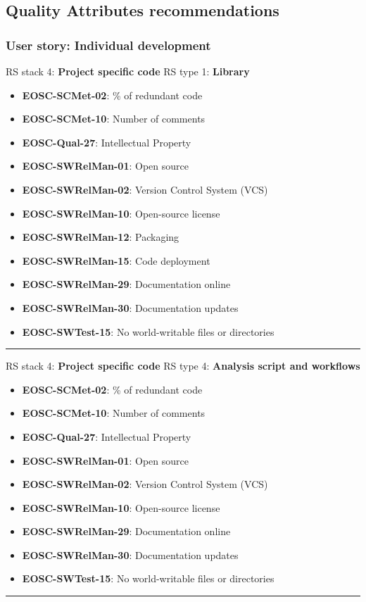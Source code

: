 \subsection{Quality Attributes recommendations}

\subsubsection{User story: Individual development}

RS stack 4: \textbf{Project specific code} \newline
RS type 1: \textbf{Library}

\begin{itemize}
    \item \textbf{EOSC-SCMet-02}: \% of redundant code
    \item \textbf{EOSC-SCMet-10}: Number of comments
    \item \textbf{EOSC-Qual-27}: Intellectual Property
    \item \textbf{EOSC-SWRelMan-01}: Open source
    \item \textbf{EOSC-SWRelMan-02}: Version Control System (VCS)
    \item \textbf{EOSC-SWRelMan-10}: Open-source license
    \item \textbf{EOSC-SWRelMan-12}: Packaging
    \item \textbf{EOSC-SWRelMan-15}: Code deployment
    \item \textbf{EOSC-SWRelMan-29}: Documentation online
    \item \textbf{EOSC-SWRelMan-30}: Documentation updates
    \item \textbf{EOSC-SWTest-15}: No world-writable files or directories
\end{itemize}
\hrule

RS stack 4: \textbf{Project specific code} \newline
RS type 4: \textbf{Analysis script and workflows}

\begin{itemize}
    \item \textbf{EOSC-SCMet-02}: \% of redundant code
    \item \textbf{EOSC-SCMet-10}: Number of comments
    \item \textbf{EOSC-Qual-27}: Intellectual Property
    \item \textbf{EOSC-SWRelMan-01}: Open source
    \item \textbf{EOSC-SWRelMan-02}: Version Control System (VCS)
    \item \textbf{EOSC-SWRelMan-10}: Open-source license
    \item \textbf{EOSC-SWRelMan-29}: Documentation online
    \item \textbf{EOSC-SWRelMan-30}: Documentation updates
    \item \textbf{EOSC-SWTest-15}: No world-writable files or directories
\end{itemize}
\hrule

